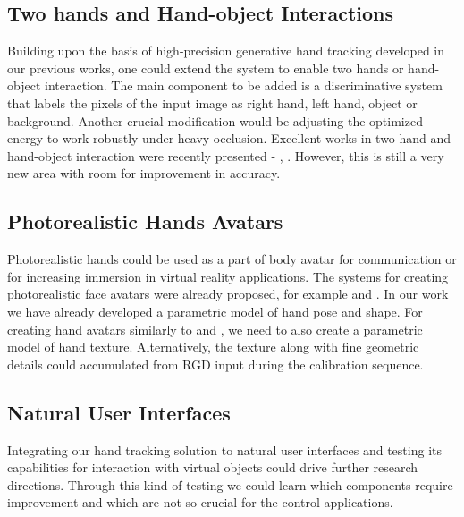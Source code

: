 \subsection*{Two hands and Hand-object Interactions}
Building upon the basis of high-precision generative hand tracking developed in our previous works, one could extend the system to enable two hands or hand-object interaction. The main component to be added is a discriminative system that labels the pixels of the input image as right hand, left hand, object or background. Another crucial modification would be adjusting the optimized energy to work robustly under heavy occlusion. Excellent works in two-hand and hand-object interaction were recently presented -  \cite{taylor2017articulated}, \cite{mueller2017real}. However, this is still a very new area with room for improvement in accuracy.

\subsection*{Photorealistic Hands Avatars}
Photorealistic hands could be used as a part of body avatar for communication or for increasing immersion in virtual reality applications. The systems for creating photorealistic face avatars were already proposed, for example \cite{thies2016face2face} and \cite{tewari2017mofa}. In our work we have already developed a parametric model of hand pose and shape. For creating hand avatars similarly to\cite{thies2016face2face} and \cite{tewari2017mofa}, we need to also create a parametric model of hand texture. Alternatively, the texture along with fine geometric details could accumulated from RGD input during the calibration sequence.

\subsection*{Natural User Interfaces}
Integrating our hand tracking solution to natural user interfaces and testing its capabilities for interaction with virtual objects could drive further research directions. Through this kind of testing we could learn which components require improvement and which are not so crucial for the control applications.






%
%


